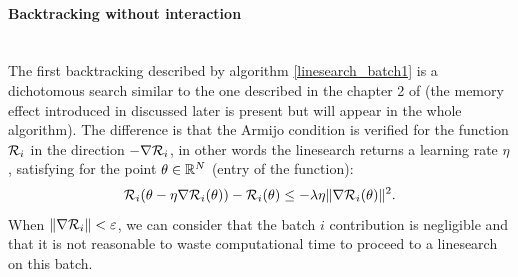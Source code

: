 \paragraph{Backtracking without interaction}
~~\\
The first backtracking described by algorithm \ref{linesearch_batch1} is a dichotomous search similar to the one described in the chapter 2 of \cite{Bilel_thesis} (the memory effect introduced in \cite{Rondepierre,Lyap_Theory_Bilel} discussed later is present but will appear in the whole algorithm). The difference is that the Armijo condition is verified for the function $\mathcal{R}_i$ in the direction $-\nabla \mathcal{R}_i$, in other words the linesearch returns a learning rate $\eta$, satisfying for the point $\theta \in \mathbb{R}^N$ (entry of the function):
\begin{equation}
	\mathcal{R}_i(\theta-\eta\nabla \mathcal{R}_i(\theta))-\mathcal{R}_i(\theta) \leq -\lambda \eta \|\nabla \mathcal{R}_i(\theta)\|^2.
	\label{armijo_batch1}
\end{equation}
When $\|\nabla \mathcal{R}_i\|<\varepsilon$, we can consider that the batch $i$ contribution is negligible and that it is not reasonable to waste computational time to proceed to a linesearch on this batch. 

